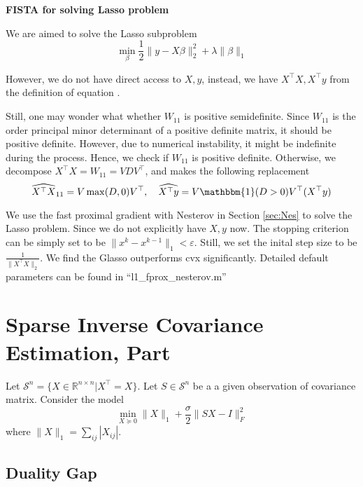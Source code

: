 \documentclass[conference,onecolumn,12pt]{IEEEtran}
\newcommand{\R}{\mathbb{R}}
\newcommand{\<}{\langle}
\renewcommand{\>}{\rangle}
\numberwithin{equation}{section}
\begin{document}
    {\bf FISTA for solving Lasso problem}

    We are aimed to solve the Lasso subproblem
    \begin{equation}
        \min_\beta \frac{1}{2}\|y-X\beta\|_2^2+\lambda\|\beta\|_1
    \end{equation}

    However, we do not have direct access to $X,y$, instead, we have $X^\top X,X^\top y$ from the definition of equation \label{eq:primallasso}. 
    
    Still, one may wonder what whether $W_{11}$ is positive semidefinite. Since $W_{11}$ is the order principal minor determinant of a positive definite matrix, it should be positive definite. However, due to numerical instability, it might be indefinite during the process. Hence, we check if $W_{11}$ is positive definite. Otherwise, we decompose $X^\top X = W_{11}=VDV^\top$, and makes the following replacement
    \begin{equation}
        \widehat{X^\top X}_{11}=V\max(D,0)V^\top,\quad \widehat{X^\top y}=V\mathbbm{1}(D>0)V^\top (X^\top y)
    \end{equation}


    We use the fast proximal gradient with Nesterov in Section \ref{sec:Nes} to solve the Lasso problem. Since we do not explicitly have $X,y$ now. The stopping criterion can be simply set to be $\|x^k-x^{k-1}\|_1<\varepsilon$. Still, we set the inital step size to be $\frac{1}{\|X^\top X\|_2}$. We find the Glasso outperforms cvx significantly. Detailed default parameters can be found in ``l1\_fprox\_nesterov.m''
\clearpage


    \section{Sparse Inverse Covariance Estimation, Part \uppercase\expandafter{}}

    Let $\mathcal{S}^n = \{{X}\in \R^{n\times n}| {X}^\top  = {X}\}$. Let ${S}\in \mathcal{S}^n$ be a a given observation of covariance matrix. Consider the model
    \begin{equation}
    \label{eq:primal2}
        \min_{{X}\succeq 0} \|{X}\|_1 + \frac{\sigma}{2}\|SX-I\|_F^2
    \end{equation}
    where $\|{X}\|_1 = \sum_{ij} |{X}_{ij}|$.
    \subsection{Duality Gap}
\end{document}

